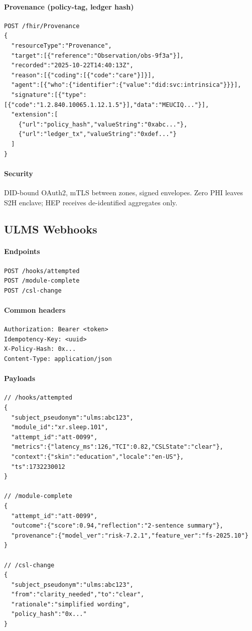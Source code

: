 \documentclass[11pt]{article}
\theoremstyle{plain}
\begin{document}
\paragraph{Provenance (policy-tag, ledger hash)}
\begin{verbatim}
POST /fhir/Provenance
{
  "resourceType":"Provenance",
  "target":[{"reference":"Observation/obs-9f3a"}],
  "recorded":"2025-10-22T14:40:13Z",
  "reason":[{"coding":[{"code":"care"}]}],
  "agent":[{"who":{"identifier":{"value":"did:svc:intrinsica"}}}],
  "signature":[{"type":[{"code":"1.2.840.10065.1.12.1.5"}],"data":"MEUCIQ..."}],
  "extension":[
    {"url":"policy_hash","valueString":"0xabc..."},
    {"url":"ledger_tx","valueString":"0xdef..."}
  ]
}
\end{verbatim}

\paragraph{Security}
DID-bound OAuth2, mTLS between zones, signed envelopes. Zero PHI leaves S2H enclave; HEP receives de-identified aggregates only.

\subsection{ULMS Webhooks}
\paragraph{Endpoints}
\begin{verbatim}
POST /hooks/attempted
POST /module-complete
POST /csl-change
\end{verbatim}

\paragraph{Common headers}
\begin{verbatim}
Authorization: Bearer <token>
Idempotency-Key: <uuid>
X-Policy-Hash: 0x...
Content-Type: application/json
\end{verbatim}

\paragraph{Payloads}
\begin{verbatim}
// /hooks/attempted
{
  "subject_pseudonym":"ulms:abc123",
  "module_id":"xr.sleep.101",
  "attempt_id":"att-0099",
  "metrics":{"latency_ms":126,"TCI":0.82,"CSLState":"clear"},
  "context":{"skin":"education","locale":"en-US"},
  "ts":1732230012
}

// /module-complete
{
  "attempt_id":"att-0099",
  "outcome":{"score":0.94,"reflection":"2-sentence summary"},
  "provenance":{"model_ver":"risk-7.2.1","feature_ver":"fs-2025.10"}
}

// /csl-change
{
  "subject_pseudonym":"ulms:abc123",
  "from":"clarity_needed","to":"clear",
  "rationale":"simplified wording",
  "policy_hash":"0x..."
}
\end{verbatim}
\end{document}
